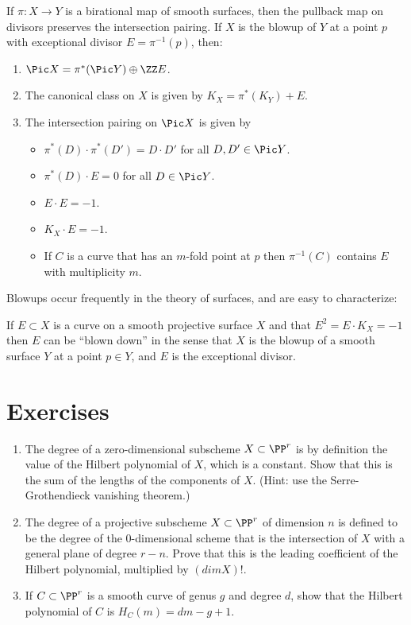 \begin{theorem}\label{divisor classes on blowup}
If $\pi: X \to Y$ is a birational map of smooth surfaces, then the pullback map on divisors
preserves the intersection pairing. If $X$ is the blowup of $Y$ at a point $p$ with exceptional
divisor $E = \pi^{-1}(p)$, then:

\begin{enumerate}
 \item $\Pic X =\pi^*(\Pic Y) \oplus \ZZ E$.
\item The canonical class on $X$ is given by $K_X = \pi^*(K_Y)+E$.
 \item The intersection pairing on $\Pic X$ is given by
 
\begin{itemize}
\item $\pi^*(D)\cdot\pi^*(D') = D\cdot D'$ for all $D,D'\in \Pic Y$.
\item $\pi^*(D)\cdot E = 0$ for all $D\in \Pic Y$.
 \item $E\cdot E = -1$.
 \item $K_X\cdot E = -1$.
 \item If $C$ is a curve that has an $m$-fold point at $p$ then $\pi^{-1}(C)$ contains $E$ with multiplicity $m$.
 \end{itemize}
\end{enumerate}
\end{theorem}

Blowups occur frequently in the theory of surfaces, and are easy to characterize:
\begin{theorem}
If $E\subset X$ is a curve on a smooth projective surface $X$ and
 that $E^2 = E\cdot K_X = -1$ then $E$ can be ``blown down'' in the sense that
 $X$ is the blowup of a smooth surface $Y$ at a point $p\in Y$, and $E$ is the exceptional divisor.
\end{theorem}


\section{Exercises}


\begin{exercise}\label{characterization of degree}
\begin{enumerate}
\item The degree of a zero-dimensional subscheme $X\subset \PP^r$ is by definition the value of the Hilbert polynomial of $X$, which is a constant. Show that
this is the sum of the lengths of the components of $X$. (Hint: use the Serre-Grothendieck vanishing theorem.)

\item The degree of a projective subscheme $X\subset \PP^r$ of dimension $n$ is defined to be the degree of the $0$-dimensional scheme
that is the intersection of $X$ with a general plane of degree $r-n$. Prove that this is the leading coefficient of the Hilbert polynomial, multiplied
by $(dim X)!$.

\item If $C\subset \PP^r$ is a smooth curve of genus $g$ and degree $d$, show that the Hilbert polynomial of $C$ is $H_C(m) = dm-g+1$.
\end{enumerate}
\end{exercise}

